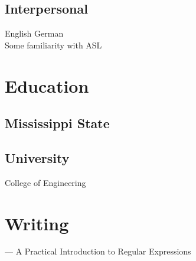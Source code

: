 \documentclass[]{resume}
\begin{document}
\begin{minipage}[t]{0.30\textwidth}
\sectionsep

\subsection{Interpersonal}
English \textbullet{} German \\
Some familiarity with ASL \\


\section{Education}

\subsection{Mississippi State}
\subsection{University}
College of Engineering \\


\sectionsep


\section{Writing}
\href{https://dev.to/hawkinjs/dont-fear-the-regex-a-practical-introduction-to-regular-expressions}{} --- A Practical Introduction to Regular Expressions \\


\end{minipage}
\end{document}
